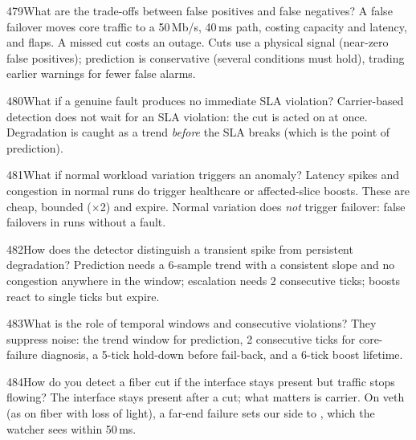 \begin{qa}{479}{What are the trade-offs between false positives and false negatives?}
A false failover moves core traffic to a 50\,Mb/s, 40\,ms path, costing capacity and latency, and flaps. A missed cut
costs an outage. Cuts use a physical signal (near-zero false positives); prediction is conservative (several
conditions must hold), trading earlier warnings for fewer false alarms.
\end{qa}

\begin{qa}{480}{What if a genuine fault produces no immediate SLA violation?}
Carrier-based detection does not wait for an SLA violation: the cut is acted on at once. Degradation is caught as a
trend \emph{before} the SLA breaks (which is the point of prediction).
\end{qa}

\begin{qa}{481}{What if normal workload variation triggers an anomaly?}
Latency spikes and congestion in normal runs do trigger healthcare or affected-slice boosts. These are cheap,
bounded ($\times$2) and expire. Normal variation does \emph{not} trigger failover: \NFalseFailoverRuns{} false failovers
in \NNoFaultRuns{} runs without a fault.
\end{qa}

\begin{qa}{482}{How does the detector distinguish a transient spike from persistent degradation?}
Prediction needs a 6-sample trend with a consistent slope and no congestion anywhere in the window; escalation needs 2
consecutive ticks; boosts react to single ticks but expire.
\end{qa}

\begin{qa}{483}{What is the role of temporal windows and consecutive violations?}
They suppress noise: the trend window for prediction, 2 consecutive ticks for core-failure diagnosis, a 5-tick
hold-down before fail-back, and a 6-tick boost lifetime.
\end{qa}

\begin{qa}{484}{How do you detect a fiber cut if the interface stays present but traffic stops flowing?}
The interface stays present after a cut; what matters is carrier. On veth (as on fiber with loss of light), a far-end
failure sets our side to , which the watcher sees within 50\,ms.
\end{qa}

